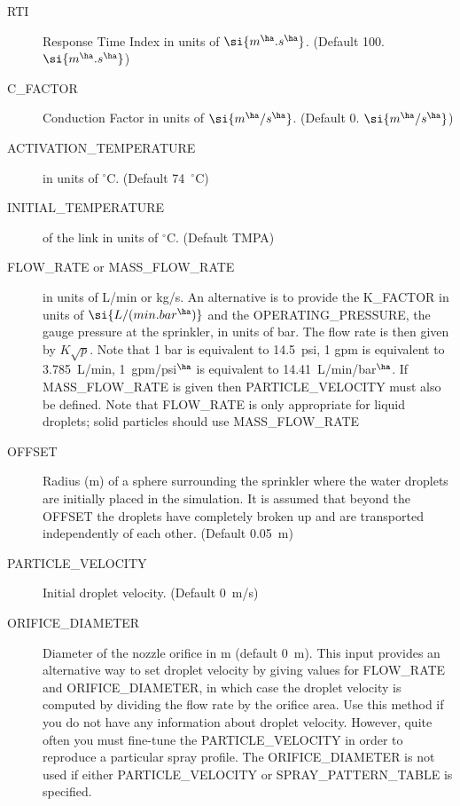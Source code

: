 \documentclass[11pt]{book}
\begin{document}
\begin{description}
\item[{\ct RTI}] Response Time Index in units of $\si{m^\ha.s^\ha}$. (Default 100. $\si{m^\ha.s^\ha}$)
\item[{\ct C\_FACTOR}] Conduction Factor in units of $\si{m^\ha/s^\ha}$. (Default 0. $\si{m^\ha/s^\ha}$)
\item[{\ct ACTIVATION\_TEMPERATURE}] in units of $^\circ$C. (Default 74~$^\circ$C)
\item[{\ct INITIAL\_TEMPERATURE}] of the link in units of $^\circ$C. (Default {\ct TMPA})
\item[{\ct FLOW\_RATE} or {\ct MASS\_FLOW\_RATE}] in units of L/min or kg/s. An alternative is to provide the {\ct K\_FACTOR} in units of $\si{L/(min.bar^{\ha})}$ and the {\ct OPERATING\_PRESSURE}, the gauge pressure at the sprinkler, in units of bar. The flow rate is then given by $K \sqrt{p}$. Note that 1 bar is equivalent to 14.5~psi, 1 gpm is equivalent to 3.785~L/min, 1~gpm/psi$^\ha$ is equivalent to 14.41~L/min/bar$^\ha$.  If {\ct MASS\_FLOW\_RATE} is given then {\ct PARTICLE\_VELOCITY} must also be defined. Note that {\ct FLOW\_RATE} is only appropriate for liquid droplets; solid particles should use {\ct MASS\_FLOW\_RATE}
\item[{\ct OFFSET}] Radius (m) of a sphere surrounding the sprinkler where the water droplets are initially placed in the simulation. It is assumed that beyond the {\ct OFFSET} the droplets have completely broken up and are transported independently of each other. (Default 0.05~m)
\item[{\ct PARTICLE\_VELOCITY}]  Initial droplet velocity. (Default 0~m/s)
\item[{\ct ORIFICE\_DIAMETER}] Diameter of the nozzle orifice in m (default 0~m). This input provides an alternative way to set droplet velocity by giving values for {\ct FLOW\_RATE} and {\ct ORIFICE\_DIAMETER}, in which case the droplet velocity is computed by dividing the flow rate by the orifice area. Use this method if you do not have any information about droplet velocity. However, quite often you must fine-tune the {\ct PARTICLE\_VELOCITY} in order to reproduce a particular spray profile. The {\ct ORIFICE\_DIAMETER} is not used if either {\ct PARTICLE\_VELOCITY} or {\ct SPRAY\_PATTERN\_TABLE} is specified.

\end{description}
\end{document}
